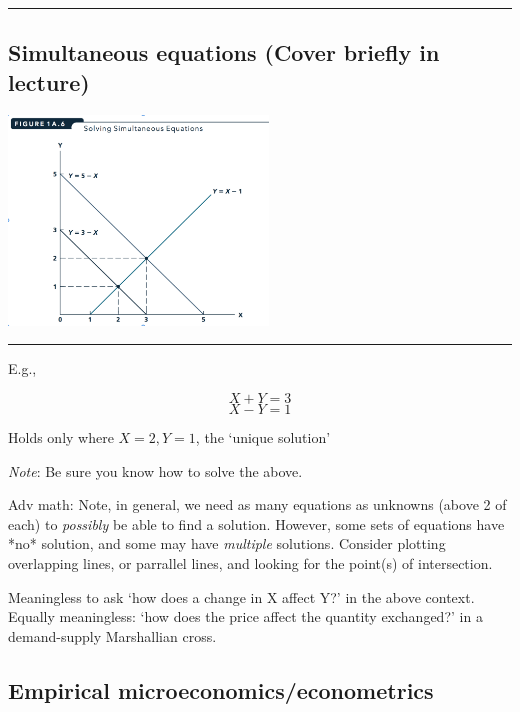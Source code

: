\documentclass[]{article}
\begin{document}
\begin{center}\rule{0.5\linewidth}{\linethickness}\end{center}

\hypertarget{simultaneous-equations-cover-briefly-in-lecture}{%
\subsection{Simultaneous equations (Cover briefly in lecture)}\label{simultaneous-equations-cover-briefly-in-lecture}}

\includegraphics[height=2.2in]{picsfigs/simeqn.png}

\begin{center}\rule{0.5\linewidth}{\linethickness}\end{center}

E.g.,

\[ X + Y = 3 \]
\[ X - Y = 1 \]

Holds only where \(X=2, Y=1\), the `unique solution'

\emph{Note}: Be sure you know how to solve the above.

\textcolor{RawSienna}{Adv math: Note, in general, we need as many equations as unknowns (above 2 of each) to \emph{possibly} be able to find a solution.  However, some sets of equations have *no* solution, and some may have \emph{multiple} solutions.  Consider plotting overlapping lines, or parrallel lines, and looking for the point(s) of intersection.}

\bigskip

Meaningless to ask `how does a change in X affect Y?' in the above context.
Equally meaningless: `how does the price affect the quantity exchanged?' in a demand-supply Marshallian cross.

\hypertarget{empirical-microeconomicseconometrics}{%
\subsection{Empirical microeconomics/econometrics}\label{empirical-microeconomicseconometrics}}
\end{document}
